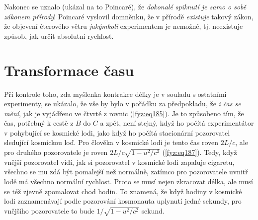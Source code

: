     Nakonec se uznalo (ukázal na to Poincaré), že \emph{dokonalé spiknutí je samo o sobě zákonem 
    přírody}! Poincaré vyslovil domněnku, že v přírodě \emph{existuje} takový zákon, že objevení 
    éterového větru \emph{jakýmkoli} experimentem je nemožné, tj. neexistuje způsob, jak určit 
    absolutní rychlost.
    
    
  \section{Transformace času}\label{fyz:IchapXVsecVI}
    Při kontrole toho, zda myšlenka kontrakce délky je v souladu s ostatními experimenty, se 
    ukázalo, že vše by bylo v pořádku za předpokladu, že \emph{i čas se mění}, jak je vyjádřeno ve 
    čtvrté z rovnic (\ref{fyz:eq185}). Je to způsobeno tím, že čas, potřebný k cestě z \(B\) do 
    \(C\) a zpět, není stejný, když ho počítá experimentátor v pohybující se kosmické lodi, jako 
    když ho počítá stacionární pozorovatel sledující kosmickou loď. Pro člověka v kosmické lodi je 
    tento čas roven \(2L/c\), ale pro druhého pozorovatele je roven \(2L/c\sqrt{1 - u^2/c^2}\) 
    (\ref{fyz:eq187}). Tedy, když vnější pozorovatel vidí, jak si pozorovatel v kosmické lodi 
    zapaluje cigaretu, všechno se mu zdá být pomalejší než normálně, zatímco pro pozorovatele 
    uvnitř lodě má všechno normální rychlost. Proto se musí nejen zkracovat délka, ale musí se též 
    zjevně zpomalovat chod hodin. To znamená, že když hodiny v kosmické lodi zaznamenávají podle 
    pozorování kosmonauta uplynutí jedné sekundy, pro vnějšího pozorovatele to bude \(1/\sqrt{1 - 
    u^2/c^2}\) sekund.
    
